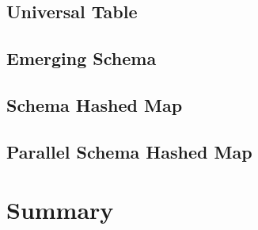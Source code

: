 {\subsection{Universal Table}


\subsection{Emerging Schema}


\subsection{Schema Hashed Map}


\subsection{Parallel Schema Hashed Map}


\section{Summary}
\label{summary}

}